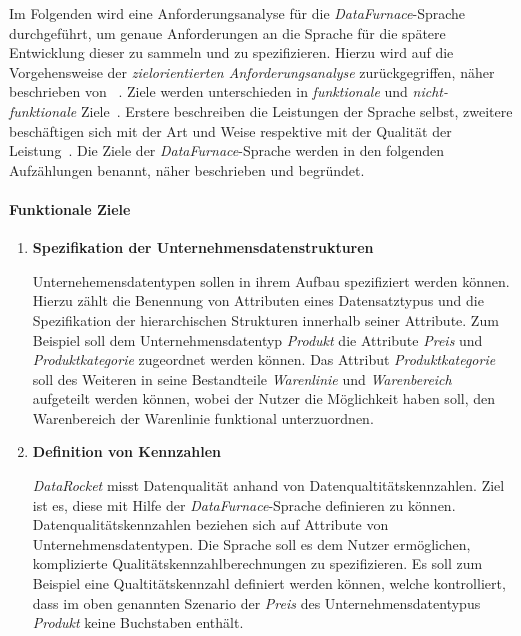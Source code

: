 \documentclass[
  language=german, %
  type=bachelor,%
  ngerman
]{isthesis}
\begin{document}
\begin{content}
	Im Folgenden wird eine Anforderungsanalyse für die
	\textit{DataFurnace}-Sprache durchgeführt, um genaue Anforderungen an die
	Sprache für die spätere Entwicklung dieser zu sammeln und zu spezifizieren.
	Hierzu wird auf die Vorgehensweise der \textit{zielorientierten
	Anforderungsanalyse} zurückgegriffen, näher beschrieben von
	\textsc{\citeauthor{van2001goal}}~\citeyearpar{van2001goal}.  Ziele werden
	unterschieden in \textit{funktionale} und \textit{nicht-funktionale}
	Ziele~\cite[][S.  36]{mylopoulos1999object}.  Erstere beschreiben die
	Leistungen der Sprache selbst, zweitere beschäftigen sich mit der Art und
	Weise respektive mit der Qualität der Leistung~\cite[][S.  250]{van2001goal}.
	Die Ziele der \textit{DataFurnace}-Sprache werden in den folgenden
	Aufzählungen benannt, näher beschrieben und begründet.

  \paragraph{Funktionale Ziele}
    \begin{enumerate}
      \item \textbf{Spezifikation der Unternehmensdatenstrukturen} 

        Unternehemensdatentypen sollen in ihrem Aufbau spezifiziert werden
        können. Hierzu zählt die Benennung von Attributen eines Datensatztypus
        und die Spezifikation der hierarchischen Strukturen innerhalb seiner
        Attribute. Zum Beispiel soll dem Unternehmensdatentyp \textit{Produkt}
        die Attribute \textit{Preis} und \textit{Produktkategorie} zugeordnet
        werden können. Das Attribut \textit{Produktkategorie} soll des Weiteren
        in seine Bestandteile \textit{Warenlinie} und \textit{Warenbereich}
        aufgeteilt werden können, wobei der Nutzer die Möglichkeit haben soll,
        den Warenbereich der Warenlinie funktional unterzuordnen.

      \item \textbf{Definition von Kennzahlen} 

        \textit{DataRocket} misst Datenqualität anhand von
        Datenqualtitätskennzahlen. Ziel ist es, diese mit Hilfe der
        \textit{DataFurnace}-Sprache definieren zu können.
        Datenqualitätskennzahlen beziehen sich auf Attribute von
        Unternehmensdatentypen. Die Sprache soll es dem Nutzer ermöglichen,
        komplizierte Qualitätskennzahlberechnungen zu spezifizieren. Es
        soll zum Beispiel eine Qualtitätskennzahl definiert werden können,
        welche kontrolliert, dass im oben genannten Szenario der \textit{Preis}
        des Unternehmensdatentypus \textit{Produkt} keine Buchstaben enthält.


\end{enumerate}
\end{content}
\end{document}
